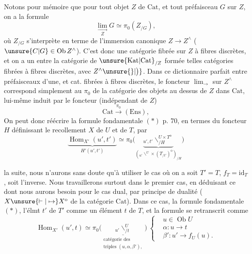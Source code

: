 Notons pour mémoire que pour tout
objet $Z$ de $\mathrm{Cat}$, et tout préfaisceau $G$
sur $Z$, on a la formule
\[
\underset{Z}{\lim_{\rightarrow}}G\simeq\pi_0(Z_{/G}),
\]
où $Z_{/G}$ s'interprète en terme de l'immersion
canonique $Z\longrightarrow Z^\wedge$ ($\unsure{C|G}\in\operatorname{Ob}Z^\wedge$).
C'est donc une catégorie fibrée sur $Z$ à fibres
discrètes, \unsure{\{}et on a  un  entre la
 catégorie  de $\unsure{\mathrm{Kat}|\mathrm{Cat}}_{/Z}$ formée  telles catégories
fibrées à fibres discrètes, avec $Z^\wedge\unsure{\}|\big)}$.
Dans ce dictionnaire parfait entre préfaisceaux
d'une, et cat. fibrées à fibres discrètes,
le foncteur $\lim_{\rightarrow}$ sur $Z^\wedge$ correspond simplement
au  $\pi_0$  de la catégorie des objets au
dessus de $Z$ dans $\mathrm{Cat}$, lui-même induit
par le foncteur (indépendant de $Z$)
\[
\mathrm{Cat}\xrightarrow{\pi_0}(\mathrm{Ens}),
\]
On peut donc réécrire la formule fondamentale
$(*)$ p. 70, en termes du foncteur $H$ définissant
le recollement $X$ de $U$ et de $T$, par
\[
\boxed{\underbrace{\operatorname{Hom}_{X'}(u',t')}_{H'(u',t')}
\simeq\pi_0\bigl(\underbrace{{}_{u',t'}\backslash^{U\times T^{\mathrm o}}_{/H}}
_{({}_{u'}\backslash^{U}\times(T_{/t'})^{\mathrm o})_{/H}}\bigr)}\tag*{(*)}
\]

 la suite, nous n'aurons sans doute qu'à
utiliser le cas où on a soit $T'=T$, $f_T=\mathrm{id}_T$,
soit l'inverse. Nous travaillerons surtout dans
le premier cas, en déduisant ce dont nous
aurons besoin pour le cas dual, par principe de
dualité ( $X\unsure{\vdash|\mapsto}X^{\mathrm o}$ de la catégorie $\mathrm{Cat}$).
Dans ce cas,  la formule fondamentale $(*)$,  l'élmt
$t'$ de $T'$  comme un élément $t$ de $T$,
et la formule se retranscrit comme
\[
\boxed{\operatorname{Hom}_{X'}(u',t)\simeq
\pi_0\bigl(\underset{\substack{\text{catégorie des}\\\text{triples }(u,\alpha,\beta'),}}{\underline{{}_{u'}\backslash^{U}_{/t}}}\bigr)}
\ \left\{\begin{aligned}
&u\in\operatorname{Ob}U\\
&\alpha:u\to t\\
&\beta':u'\to f_U(u).
\end{aligned}\right.\tag*{(**)}
\]

